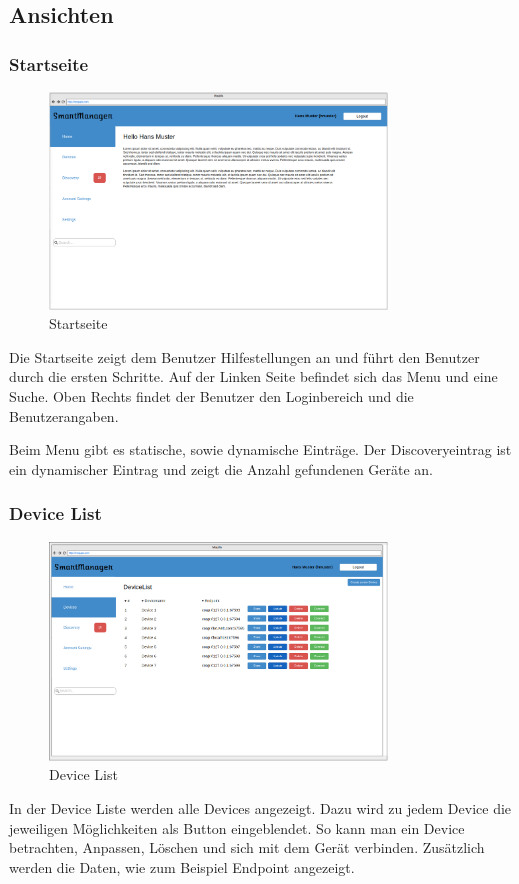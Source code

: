 \subsection{Ansichten}
\subsubsection{Startseite}
\begin{figure} [H]
	\begin{center}
	\includegraphics[width=0.80\textwidth]{../03_Design/images/home.png}
	\caption{Startseite}
	\end{center}
\end{figure}
Die Startseite zeigt dem Benutzer Hilfestellungen an und führt den Benutzer durch die ersten Schritte. Auf der Linken Seite befindet sich das Menu und eine Suche. Oben Rechts findet der Benutzer den Loginbereich und die Benutzerangaben.

Beim Menu gibt es statische, sowie dynamische Einträge. Der Discoveryeintrag ist ein dynamischer Eintrag und zeigt die Anzahl gefundenen Geräte an.

\subsubsection{Device List}
\begin{figure} [H]
	\begin{center}
	\includegraphics[width=0.80\textwidth]{../03_Design/images/devicelist.png}
	\caption{Device List}
	\end{center}
\end{figure}
In der Device Liste werden alle Devices angezeigt. Dazu wird zu jedem Device die jeweiligen Möglichkeiten als Button eingeblendet. So kann man ein Device betrachten, Anpassen, Löschen und sich mit dem Gerät verbinden. Zusätzlich werden die Daten, wie zum Beispiel Endpoint angezeigt.

